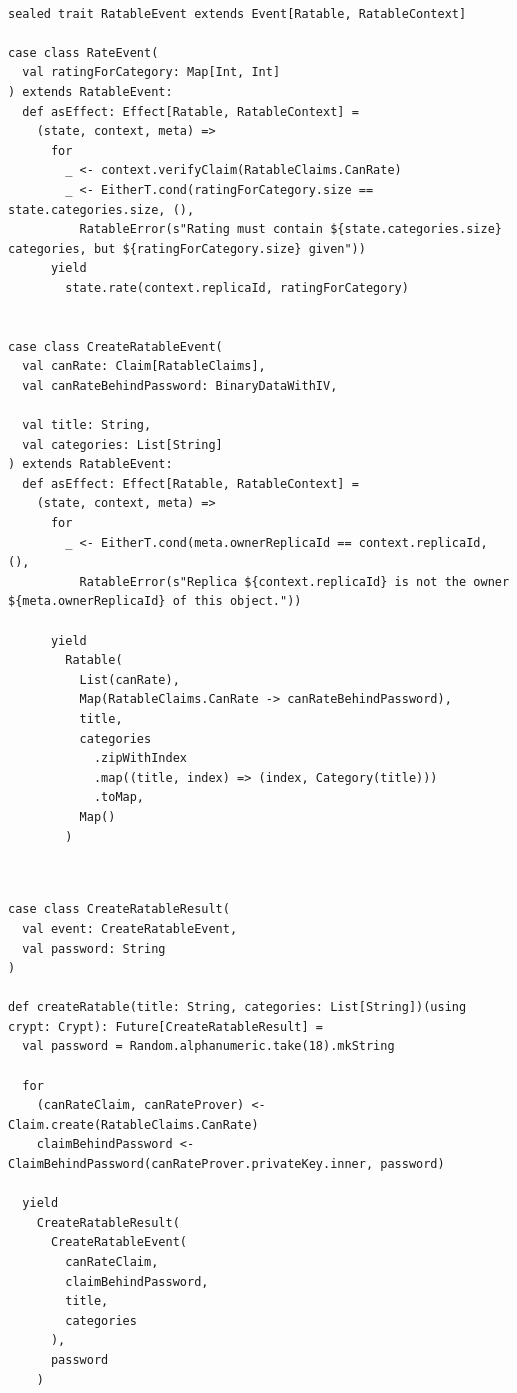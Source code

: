 \documentclass[
	ngerman,
	ruledheaders=section,   %
	class=report,		    %
	thesis={type=bachelor}, %
	accentcolor=9c,			%
	custommargins=false,    %
	marginpar=false,        %
	parskip=half-,          %
	fontsize=11pt,          %
]{tudapub}
\begin{document}
\begin{lstlisting}

sealed trait RatableEvent extends Event[Ratable, RatableContext]

case class RateEvent(
  val ratingForCategory: Map[Int, Int]
) extends RatableEvent:
  def asEffect: Effect[Ratable, RatableContext] =
    (state, context, meta) =>
      for
        _ <- context.verifyClaim(RatableClaims.CanRate)
        _ <- EitherT.cond(ratingForCategory.size == state.categories.size, (),
          RatableError(s"Rating must contain ${state.categories.size} categories, but ${ratingForCategory.size} given"))
      yield
        state.rate(context.replicaId, ratingForCategory)


case class CreateRatableEvent(
  val canRate: Claim[RatableClaims],
  val canRateBehindPassword: BinaryDataWithIV,

  val title: String,
  val categories: List[String]  
) extends RatableEvent:
  def asEffect: Effect[Ratable, RatableContext] =
    (state, context, meta) =>
      for
        _ <- EitherT.cond(meta.ownerReplicaId == context.replicaId, (),
          RatableError(s"Replica ${context.replicaId} is not the owner ${meta.ownerReplicaId} of this object."))
        
      yield
        Ratable(
          List(canRate),
          Map(RatableClaims.CanRate -> canRateBehindPassword),
          title,
          categories
            .zipWithIndex
            .map((title, index) => (index, Category(title)))
            .toMap,
          Map()
        )
		
\end{lstlisting}

\begin{lstlisting}

case class CreateRatableResult(
  val event: CreateRatableEvent,
  val password: String
)

def createRatable(title: String, categories: List[String])(using crypt: Crypt): Future[CreateRatableResult] =
  val password = Random.alphanumeric.take(18).mkString

  for
    (canRateClaim, canRateProver) <- Claim.create(RatableClaims.CanRate)
    claimBehindPassword <- ClaimBehindPassword(canRateProver.privateKey.inner, password)

  yield
    CreateRatableResult(
      CreateRatableEvent(
        canRateClaim,
        claimBehindPassword,
        title,
        categories
      ),
      password
    )

\end{lstlisting}
\end{document}
